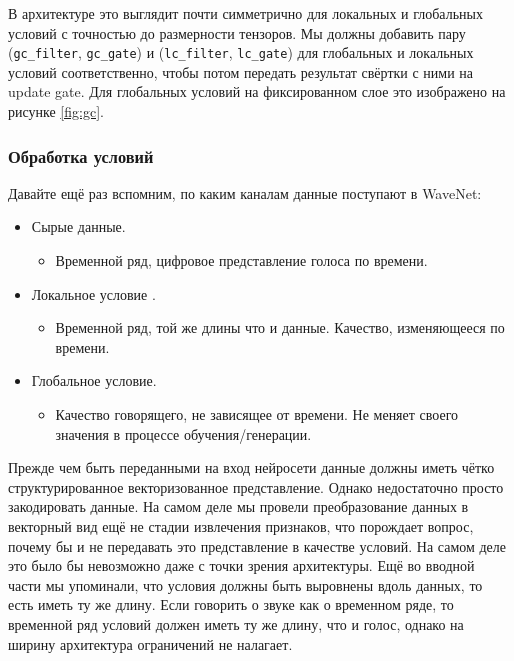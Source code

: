 \documentclass[../diploma.tex]{subfiles}
\begin{document}
В архитектуре это выглядит почти симметрично для локальных и глобальных условий с точностью до размерности тензоров. Мы должны добавить пару (\verb|gc_filter|, \verb|gc_gate|) и (\verb|lc_filter|, \verb|lc_gate|) для глобальных и локальных условий соответственно, чтобы потом передать результат свёртки с ними на update gate. Для глобальных условий на фиксированном слое это изображено на рисунке \ref{fig:gc}.


    
\newpage    

\subsubsection{Обработка условий}

Давайте ещё  раз вспомним, по каким каналам данные поступают в WaveNet:

\begin{itemize}
    \item Сырые данные.
    \begin{itemize}
        \item Временной ряд, цифровое представление голоса по времени.
    \end{itemize}
    \item Локальное условие .
    \begin{itemize}
        \item Временной ряд, той же длины что и данные. Качество, изменяющееся по времени.
    \end{itemize}
    \item Глобальное условие.
    \begin{itemize}
        \item Качество говорящего, не зависящее от времени. Не меняет своего значения в процессе обучения/генерации.
    \end{itemize}
\end{itemize}


Прежде чем быть переданными на вход нейросети данные должны иметь чётко структурированное векторизованное представление. Однако недостаточно просто закодировать данные. На самом деле мы провели преобразование данных в векторный вид ещё не стадии извлечения признаков, что порождает вопрос, почему бы и не передавать это представление в качестве условий.
На самом деле это было бы невозможно даже с точки зрения архитектуры. Ещё во вводной части мы упоминали, что условия должны быть выровнены вдоль данных, то есть иметь ту же длину. Если говорить о звуке как о временном ряде, то временной ряд условий должен иметь ту же длину, что и голос, однако на ширину архитектура ограничений не налагает.
\end{document}
